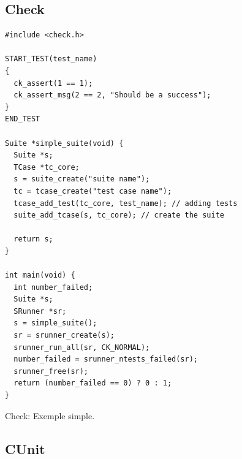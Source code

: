 \documentclass[a4paper]{article}
\begin{document}
\subsection*{Check}

\begin{listing}[ht!]
\begin{verbatim}
#include <check.h>

START_TEST(test_name)
{
  ck_assert(1 == 1);
  ck_assert_msg(2 == 2, "Should be a success");
}
END_TEST

Suite *simple_suite(void) {
  Suite *s;
  TCase *tc_core;
  s = suite_create("suite name");
  tc = tcase_create("test case name");
  tcase_add_test(tc_core, test_name); // adding tests
  suite_add_tcase(s, tc_core); // create the suite

  return s;
}

int main(void) {
  int number_failed;
  Suite *s;
  SRunner *sr;
  s = simple_suite();
  sr = srunner_create(s);
  srunner_run_all(sr, CK_NORMAL);
  number_failed = srunner_ntests_failed(sr);
  srunner_free(sr);
  return (number_failed == 0) ? 0 : 1;
}
\end{verbatim}
\caption{Check: Exemple simple.}
\label{check-example}
\end{listing}

\clearpage{}
\subsection*{CUnit}
\end{document}
